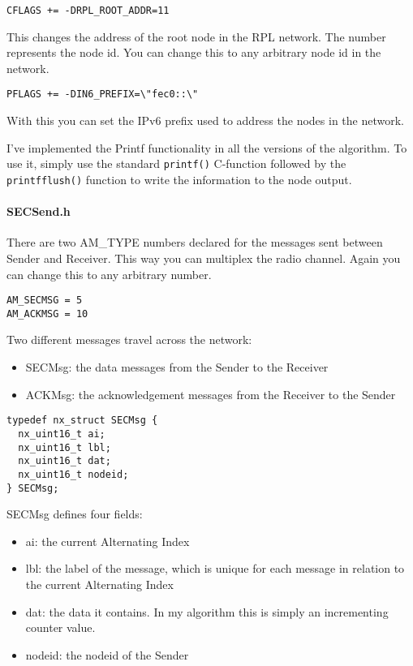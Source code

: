 \texttt{CFLAGS += -DRPL\_ROOT\_ADDR=11}

This changes the address of the root node in the RPL network. The number
represents the node id. You can change this to any arbitrary node id in
the network.

\texttt{PFLAGS += -DIN6\_PREFIX=\textbackslash{}"fec0::\textbackslash{}"}

With this you can set the IPv6 prefix used to address the nodes in the
network.

I've implemented the Printf functionality in all the versions of the
algorithm. To use it, simply use the standard \texttt{printf()}
C-function followed by the \texttt{printfflush()} function to write the
information to the node output.

\paragraph{SECSend.h}\label{secsend.h}

There are two AM\_TYPE numbers declared for the messages sent between
Sender and Receiver. This way you can multiplex the radio channel. Again
you can change this to any arbitrary number.

\begin{verbatim}
AM_SECMSG = 5
AM_ACKMSG = 10
\end{verbatim}

Two different messages travel across the network:

\begin{itemize}
\itemsep1pt\parskip0pt
\item
  SECMsg: the data messages from the Sender to the Receiver
\item
  ACKMsg: the acknowledgement messages from the Receiver to the Sender
\end{itemize}

\begin{verbatim}
typedef nx_struct SECMsg {
  nx_uint16_t ai;
  nx_uint16_t lbl;
  nx_uint16_t dat;
  nx_uint16_t nodeid;
} SECMsg;
\end{verbatim}

SECMsg defines four fields:

\begin{itemize}
\itemsep1pt\parskip0pt
\item
  ai: the current Alternating Index
\item
  lbl: the label of the message, which is unique for each message in
  relation to the current Alternating Index
\item
  dat: the data it contains. In my algorithm this is simply an
  incrementing counter value.
\item
  nodeid: the nodeid of the Sender
\end{itemize}

